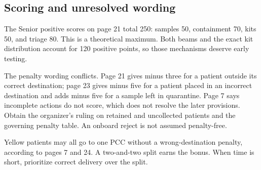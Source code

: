 \documentclass[10pt,a4paper]{article}
\begin{document}
\subsection{Scoring and unresolved wording}
The Senior positive scores on page 21 total 250: samples 50, containment 70, kits 50, and triage 80. This is a theoretical maximum. Both beams and the exact kit distribution account for 120 positive points, so those mechanisms deserve early testing.

The penalty wording conflicts. Page 21 gives minus three for a patient outside its correct destination; page 23 gives minus five for a patient placed in an incorrect destination and adds minus five for a sample left in quarantine. Page 7 says incomplete actions do not score, which does not resolve the later provisions. Obtain the organizer's ruling on retained and uncollected patients and the governing penalty table. An onboard reject is not assumed penalty-free.

Yellow patients may all go to one PCC without a wrong-destination penalty, according to pages 7 and 24. A two-and-two split earns the bonus. When time is short, prioritize correct delivery over the split.
\end{document}
